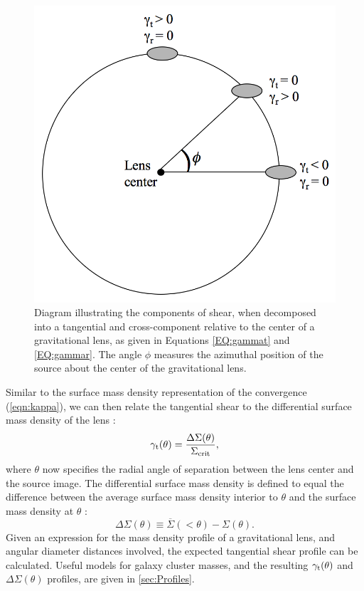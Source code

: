 \begin{figure}
\begin{center}
\includegraphics[scale=0.4]{plots_intro/TangentialShear.png}
\caption[Tangential Shear]{Diagram illustrating the components of shear, when decomposed into a tangential and cross-component relative to the center of a gravitational lens, as given in Equations \ref{EQ:gammat} and \ref{EQ:gammar}. The angle $\phi$ measures the azimuthal position of the source about the center of the gravitational lens.}
\label{plot:shearcomponents}
\end{center}
\end{figure}

Similar to the surface mass density representation of the convergence (\autoref{eqn:kappa}), we can then relate the tangential shear to the differential surface mass density of the lens \citep{KS93,Kaiser94,Fahlman94}:
\begin{equation}
\gamma_{\rm t}(\theta) = \frac{\Delta\Sigma(\theta)}{\Sigma_{\rm crit}},
\end{equation}
where $\theta$ now specifies the radial angle of separation between the lens center and the source image. The differential surface mass density is defined to equal the difference between the average surface mass density interior to $\theta$ and the surface mass density at $\theta$ \citep{Wright00}: 
\begin{equation}
\label{eqn:deltasigma}
\Delta\Sigma(\theta) \equiv \overline{\Sigma}(< \theta) - \Sigma(\theta).
\end{equation}
Given an expression for the mass density profile of a gravitational lens, and angular diameter distances involved, the expected tangential shear profile can be calculated. Useful models for galaxy cluster masses, and the resulting $\gamma_{\rm t}(\theta)$ and $\Delta\Sigma(\theta)$ profiles, are given in \autoref{sec:Profiles}.

